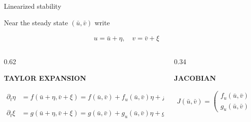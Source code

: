 \begin{frame}{Linearized stability}

  \vspace{-0.22cm}

  {\color{HydraMuted}\fontsize{7.9}{9.6}\selectfont
    Near the steady state $(\bar u,\bar v)$ write
  \par}

  \vspace{-0.40cm}

  {\color{HydraWhite}\fontsize{10.2}{13}\selectfont
  \begin{align*}
    u=\bar u+\eta, \quad 
    v=\bar v+\xi
  \end{align*}
  }

  \vspace{-0.52cm}

  \begin{columns}[T,onlytextwidth]

    \begin{column}{0.62\textwidth}
      {\color{HydraGold}\bfseries\fontsize{7.7}{9.2}\selectfont
        TAYLOR EXPANSION\par}

      \vspace{-0.24cm}

      {\color{HydraWhite}\fontsize{8.6}{10.8}\selectfont
      \begin{align*}
        \partial_t \eta
        &=
        f(\bar u+\eta,\bar v+\xi)=f(\bar u,\bar v)
        +
        f_u(\bar u,\bar v)\eta
        +
        f_v(\bar u,\bar v)\xi
        +
        O\!\left(\lVert(\eta,\xi)\rVert^2\right) \\
        \partial_t \xi
        &=
        g(\bar u+\eta,\bar v+\xi)=g(\bar u,\bar v)
        +
        g_u(\bar u,\bar v)\eta
        +
        g_v(\bar u,\bar v)\xi
        +
        O\!\left(\lVert(\eta,\xi)\rVert^2\right)
      \end{align*}
      }

    \end{column}

    \begin{column}{0.34\textwidth}
      {\color{HydraGold}\bfseries\fontsize{7.7}{9.2}\selectfont
        \centering JACOBIAN\par}

      \vspace{-0.26cm}

    {\color{HydraWhite}\fontsize{10.2}{13}\selectfont
    \begin{align*}
      \boxed{
        J(\bar u,\bar v)
        =
        \begin{pmatrix}
          f_u(\bar u,\bar v) & f_v(\bar u,\bar v)
          \\
          g_u(\bar u,\bar v) & g_v(\bar u,\bar v)
        \end{pmatrix}
      }
    \end{align*}
    }



\end{column}
\end{columns}
\end{frame}
